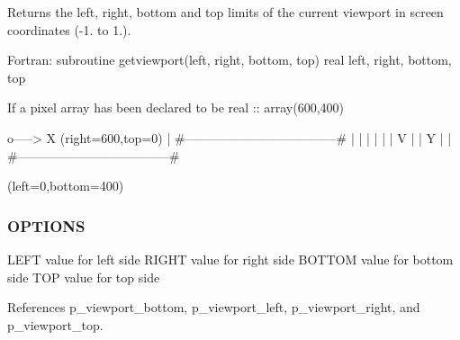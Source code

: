 Returns the left, right, bottom and top limits of the current viewport in screen coordinates (-\/1. to 1.). \begin{DoxyVerb}Fortran:
     subroutine getviewport(left, right, bottom, top)
     real left, right, bottom, top
\end{DoxyVerb}
 If a pixel array has been declared to be real \+:\+: array(600,400) \begin{DoxyVerb} o-----> X                         (right=600,top=0)
 | #------------------------------------#
 | |                                    |
 | |                                    |
 V |                                    |
 Y |                                    |
   #------------------------------------#
\end{DoxyVerb}
 (left=0,bottom=400)

\subsubsection*{O\+P\+T\+I\+O\+NS}

L\+E\+FT value for left side R\+I\+G\+HT value for right side B\+O\+T\+T\+OM value for bottom side T\+OP value for top side 

References p\+\_\+viewport\+\_\+bottom, p\+\_\+viewport\+\_\+left, p\+\_\+viewport\+\_\+right, and p\+\_\+viewport\+\_\+top.

\mbox{\label{namespacem__pixel_a80dc3cb149287470a9837de8dd3f05bc}} 
